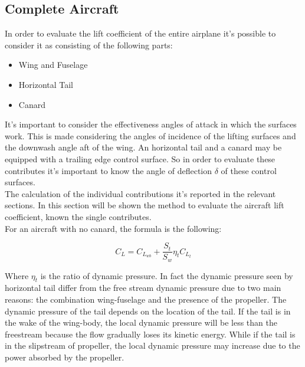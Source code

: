 		




\subsection{Complete Aircraft}

In order to evaluate the lift coefficient of the entire airplane it's possible to consider it as consisting of the following parts\cite{ roskam2002airplane}:

\begin{itemize}
\item Wing and Fuselage
\item Horizontal Tail
\item Canard
\end{itemize}

It's important to consider the effectiveness angles of attack in which the surfaces work. This is made considering the angles of incidence of the lifting surfaces and the downwash angle aft of the wing. An horizontal tail and a canard may be equipped with a trailing edge control surface. So in order to evaluate these contributes it's important to know the angle of deflection $\delta$ of these control surfaces.\\
The calculation of the individual contributions it's reported in the relevant sections. In this section will be shown the method to evaluate the aircraft lift coefficient, known the single contributes.\\
For an aircraft with no canard, the formula is the following:

\begin{equation}
C_L = C_{L_{wb}} + \frac{S_t}{S_w} \eta_t C_{L_{t}}
\end{equation}

Where $\eta_t$ is the ratio of dynamic pressure. In fact the dynamic pressure seen by horizontal tail differ from the free stream dynamic pressure due to two main reasons: the combination wing-fuselage and the presence of the propeller. The dynamic pressure of the tail depends on the location of the tail. If the tail is in the wake of the wing-body, the local dynamic pressure will be less than the freestream because the flow gradually loses its kinetic energy. While if the tail is in the slipstream of propeller, the local dynamic pressure may increase due to the power absorbed by the propeller.




